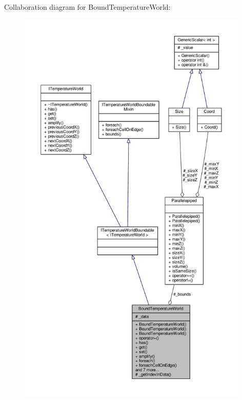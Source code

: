 Collaboration diagram for Bound\-Temperature\-World\-:
\nopagebreak
\begin{figure}[H]
\begin{center}
\leavevmode
\includegraphics[height=550pt]{class_bound_temperature_world__coll__graph}
\end{center}
\end{figure}
